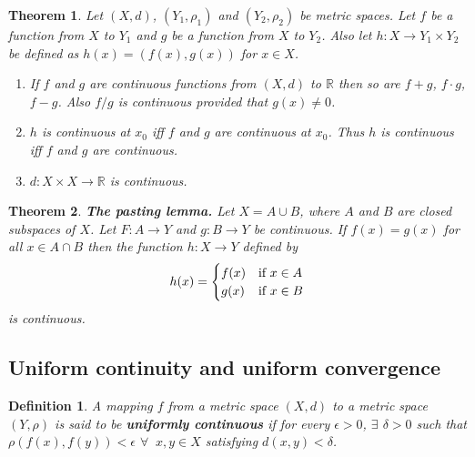 \documentclass[two column]{article}
\newtheorem{theorem}{Theorem}[subsection]
\newtheorem{definition}{Definition}[subsection]
\begin{document}
\begin{theorem}
Let $(X,d)$, $(Y_{1}, \rho_{1})$ and $(Y_{2}, \rho_{2})$ be metric spaces. Let $f$ be a function from $X$ to $Y_{1}$ and $g$ be a function from $X$ to $Y_{2}$. Also let $h: X \rightarrow Y_{1} \times Y_{2}$ be defined as $h(x) = (f(x),g(x))$ for $x\in X$. 
\begin{enumerate}
\item If $f$ and $g$ are continuous functions from $(X,d)$ to $\mathbb{R}$ then so are $f + g$, $f \cdot g$, $f-g$. Also $f/g$ is continuous provided that $g(x) \neq 0$. 
\item $h$ is continuous at $x_{0}$ iff $f$ and $g$ are continuous at $x_{0}$. Thus $h$ is continuous iff $f$ and $g$ are continuous. 
\item$d: X \times X \rightarrow \mathbb{R}$ is continuous. \\
\end{enumerate}
\end{theorem}

\begin{theorem}
{\bf The pasting lemma.} Let $X = A \cup B$, where $A$ and $B$ are closed subspaces of $X$. Let $F : A \rightarrow Y$ and $g : B \rightarrow Y$ be continuous. If $f(x) = g(x)$ for all $x \in A \cap B$ then the function $h : X \rightarrow Y$ defined by \vspace{-5pt}
\[
h(x) = \begin{cases} f(x) &\text{if } x \in A \\ g(x) &\text{if } x \in B \end{cases} \vspace{-5pt}
\]
is continuous. 
\end{theorem}

\subsection{Uniform continuity and uniform convergence}

\begin{definition}
A mapping $f$ from a metric space $(X,d)$ to a metric space $(Y,\rho)$ is said to be {\bf uniformly continuous} if for every $\epsilon > 0$, $\exists$ $\delta > 0$ such that $\rho(f(x),f(y)) < \epsilon$ $\forall \;\; x,y \in X$ satisfying $d(x,y) < \delta$. \\
\end{definition}
\end{document}
